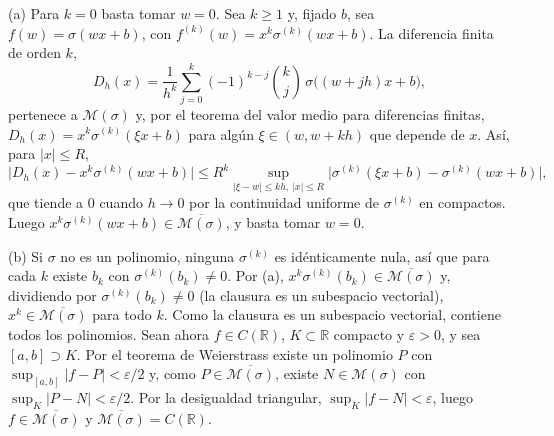 \begin{demostracion}
(a) Para $k=0$ basta tomar $w=0$. Sea $k\ge 1$ y, fijado $b$, sea $f(w)=\sigma(wx+b)$, con $f^{(k)}(w) = x^k\sigma^{(k)}(wx+b)$. La diferencia finita de orden $k$,
\[
  D_h(x) = \frac{1}{h^k}\sum_{j=0}^{k}(-1)^{k-j}\binom{k}{j}\,\sigma\bigl((w+jh)x+b\bigr),
\]
pertenece a $\mathcal{M}(\sigma)$ y, por el teorema del valor medio para diferencias finitas, $D_h(x) = x^k\sigma^{(k)}(\xi x+b)$ para algún $\xi\in(w,w+kh)$ que depende de $x$. Así, para $|x|\le R$,
\[
  \bigl|D_h(x)-x^k\sigma^{(k)}(wx+b)\bigr| \le R^k \sup_{|\xi-w|\le kh,\ |x|\le R}\bigl|\sigma^{(k)}(\xi x+b)-\sigma^{(k)}(wx+b)\bigr|,
\]
que tiende a $0$ cuando $h\to 0$ por la continuidad uniforme de $\sigma^{(k)}$ en compactos. Luego $x^k\sigma^{(k)}(wx+b)\in\overline{\mathcal{M}(\sigma)}$, y basta tomar $w=0$.

(b) Si $\sigma$ no es un polinomio, ninguna $\sigma^{(k)}$ es idénticamente nula, así que para cada $k$ existe $b_k$ con $\sigma^{(k)}(b_k)\ne 0$. Por (a), $x^k\sigma^{(k)}(b_k)\in\overline{\mathcal{M}(\sigma)}$ y, dividiendo por $\sigma^{(k)}(b_k)\ne 0$ (la clausura es un subespacio vectorial), $x^k\in\overline{\mathcal{M}(\sigma)}$ para todo $k$.
Como la clausura es un subespacio vectorial, contiene todos los polinomios. Sean ahora $f\in C(\mathbb{R})$, $K\subset\mathbb{R}$ compacto y $\varepsilon>0$, y sea $[a,b]\supset K$. Por el teorema de Weierstrass existe un polinomio $P$ con $\sup_{[a,b]}|f-P|<\varepsilon/2$ y, como $P\in\overline{\mathcal{M}(\sigma)}$, existe $N\in\mathcal{M}(\sigma)$ con $\sup_K|P-N|<\varepsilon/2$. Por la desigualdad triangular, $\sup_K|f-N|<\varepsilon$, luego $f\in\overline{\mathcal{M}(\sigma)}$ y $\overline{\mathcal{M}(\sigma)}=C(\mathbb{R})$.
\end{demostracion}

